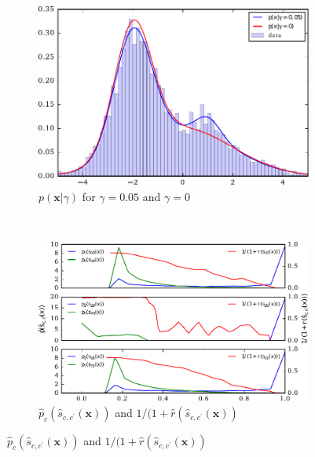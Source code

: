 \documentclass[12pt]{article}
\numberwithin{equation}{section}
\theoremstyle{plain}
\begin{document}
\begin{figure}
    \centering
    \begin{subfigure}[b]{0.4\textwidth}
        \includegraphics[width=\textwidth]{figures/fig1a.pdf}
        \caption{$p(\mathbf{x}|\gamma)$  for $\gamma=0.05$ and $\gamma=0$}
        \label{fig:1a}
    \end{subfigure}
    ~ %
    \begin{subfigure}[b]{0.4\textwidth}
        \hspace{-.2em}\includegraphics[width=1.10\textwidth]{figures/fig1b.pdf}
        \caption{$\hat{p}_c(\hat{s}_{c,c^\prime}(\mathbf{x}) )$ and $1/(1+\hat{r}(\hat{s}_{c,c^\prime}(\mathbf{x}))$}
        \label{fig:p_sij}
    \end{subfigure}


\end{figure}
\end{document}
